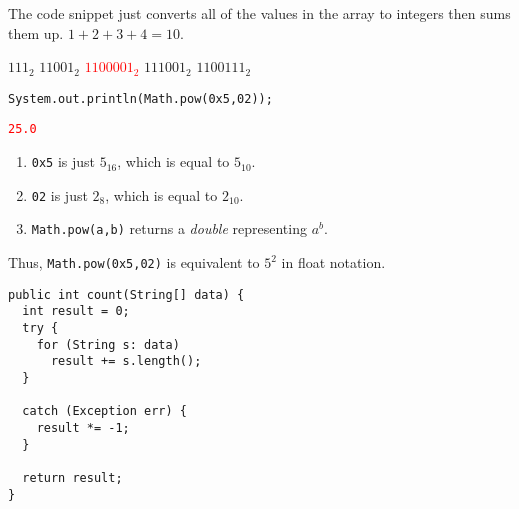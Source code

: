 \documentclass[11pt,addpoints]{exam}
\begin{document}
\begin{questions}
The code snippet just converts all of the values in the array to integers then sums them up. $1+2+3+4=10$. \\

\begin{minipage}{\textwidth}

\begin{choices}
  \choice $111_{2}$
  \choice $11001_{2}$
  \choice \textcolor{red}{$1100001_{2}$}
  \choice $111001_{2}$
  \choice $1100111_{2}$ \\
\end{choices}
\end{minipage}

\begin{minipage}{\textwidth}

\begin{verbatim}
System.out.println(Math.pow(0x5,02));
\end{verbatim}

\begin{choices}
  \choice \textcolor{red}{\tt 25.0} \\
\end{choices}
\end{minipage}

\begin{enumerate}
  \item {\tt 0x5} is just $5_{16}$, which is equal to $5_{10}$.
  \item {\tt 02} is just $2_{8}$, which is equal to $2_{10}$.
  \item {\tt Math.pow(a,b)} returns a \textit{double} representing $a^{b}$.
\end{enumerate}

Thus, {\tt Math.pow(0x5,02)} is equivalent to $5^{2}$ in float notation.

\begin{minipage}{\textwidth}

\begin{verbatim}
public int count(String[] data) {
  int result = 0;
  try {
    for (String s: data)
      result += s.length();
  }

  catch (Exception err) {
    result *= -1;
  }

  return result;
}


\end{verbatim}
\end{minipage}
\end{questions}
\end{document}
